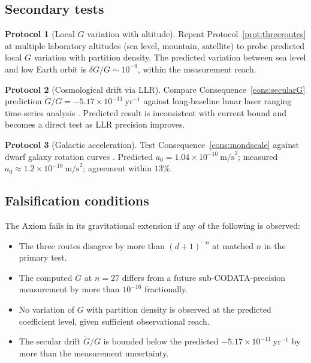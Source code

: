 \documentclass[11pt,twocolumn,a4paper]{article}
\theoremstyle{axiomstyle}
\theoremstyle{conseqstyle}
\theoremstyle{definition}
\newtheorem{protocol}{Protocol}
\theoremstyle{remark}
\begin{document}
\subsection{Secondary tests}

\begin{protocol}[Local $G$ variation with altitude]
\label{prot:altitude}
Repeat Protocol~\ref{prot:threeroutes} at multiple laboratory altitudes (sea level, mountain, satellite) to probe predicted local $G$ variation with partition density. The predicted variation between sea level and low Earth orbit is $\delta G/G\sim 10^{-9}$, within the measurement reach.
\end{protocol}

\begin{protocol}[Cosmological drift via LLR]
\label{prot:LLR}
Compare Consequence~\ref{cons:secularG} prediction $\dot G/G=-5.17\times10^{-11}~\mathrm{yr}^{-1}$ against long-baseline lunar laser ranging time-series analysis \citep{hofmann2010}. Predicted result is inconsistent with current bound and becomes a direct test as LLR precision improves.
\end{protocol}

\begin{protocol}[Galactic acceleration]
\label{prot:galactic}
Test Consequence~\ref{cons:mondscale} against dwarf galaxy rotation curves \citep{mcgaugh2016}. Predicted $a_{0}=1.04\times10^{-10}~\mathrm{m/s}^{2}$; measured $a_{0}\approx 1.2\times10^{-10}~\mathrm{m/s}^{2}$; agreement within $13\%$.
\end{protocol}

\subsection{Falsification conditions}

The Axiom fails in its gravitational extension if any of the following is observed:
\begin{itemize}[nosep]
\item The three routes disagree by more than $(d+1)^{-n}$ at matched $n$ in the primary test.
\item The computed $G$ at $n=27$ differs from a future sub-CODATA-precision measurement by more than $10^{-16}$ fractionally.
\item No variation of $G$ with partition density is observed at the predicted coefficient level, given sufficient observational reach.
\item The secular drift $\dot G/G$ is bounded below the predicted $-5.17\times10^{-11}~\mathrm{yr}^{-1}$ by more than the measurement uncertainty.
\end{itemize}
\end{document}
